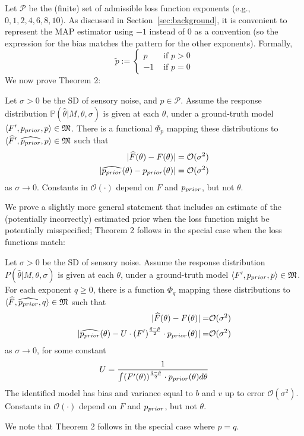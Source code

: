 Let $\mathcal{P}$ be the (finite) set of admissible loss function exponents (e.g., $0, 1, 2, 4, 6, 8, 10$).
As discussed in Section~\ref{sec:background}, it is convenient to represent the MAP estimator using $-1$ instead of $0$ as a convention (so the expression for the bias matches the pattern for the other exponents). Formally,
\begin{equation}\label{eq:tilde-p}
    \tilde{p} := \begin{cases} p &\text{ if } p > 0 \\ -1 & \text{ if } p=0\end{cases}
\end{equation}
We now prove Theorem 2:
\begin{thm}\label{thm:identifiability-well-specified}
Let $\sigma > 0$ be the SD of sensory noise, and $p \in \mathcal{P}$.
Assume the 
response distribution $\mathbb{P}(\widehat{\theta}|M,\theta, \sigma)$ is given at each $\theta$, under a ground-truth model $\langle F', p_{prior},p \rangle \in \mathfrak{M}$. 
There is a functional $\Phi_p$ mapping these distributions to $\langle \widehat{F}', \widehat{p_{prior}},p \rangle \in \mathfrak{M}$ such that 
\begin{align*}
|\widehat{F}(\theta) - F(\theta)| &= \mathcal{O}(\sigma^2) \\
|\widehat{p_{prior}}(\theta) - p_{prior}(\theta) | &= \mathcal{O}(\sigma^2) 
\end{align*}
as $\sigma \rightarrow 0$.
Constants in $\mathcal{O}(\cdot)$ depend on $F$ and $p_{prior}$, but not  $\theta$. 
\end{thm}
We prove a slightly more general statement that includes an estimate of the (potentially incorrectly) estimated prior when the loss function might be potentially misspecified; Theorem 2 follows in the special case when the loss functions match: 
\begin{thm}\label{thm:identifiability}
Let $\sigma > 0$ be the SD of sensory noise.
Assume the 
response distribution $P(\widehat{\theta}|M,\theta, \sigma)$ is given at each $\theta$, under a ground-truth model $\langle F', p_{prior},p \rangle \in \mathfrak{M}$. 
For each exponent $q \geq 0$, there is a function $\Phi_q$ mapping these distributions to $\langle \widehat{F}, \widehat{p_{prior}},q \rangle \in \mathfrak{M}$ such that 
\begin{align*}
|\widehat{F}(\theta) - F(\theta)| =& \mathcal{O}(\sigma^2) \\
|\widehat{p_{prior}}(\theta) - U \cdot (F')^{\frac{\tilde{q}-\tilde{p}}{2}} \cdot p_{prior}(\theta) | =& \mathcal{O}(\sigma^2) 
\end{align*}
as $\sigma \rightarrow 0$, for some constant
\begin{equation}
    U = \frac{1}{\int (F'(\theta))^{\frac{\tilde{q}-\tilde{p}}{2}} \cdot p_{prior}(\theta) d\theta }
\end{equation}
The identified model has bias and variance equal to $b$ and $v$ up to error $\mathcal{O}(\sigma^2)$.
Constants in $\mathcal{O}(\cdot)$ depend on $F$ and $p_{prior}$, but not  $\theta$. 
\end{thm}
We note that Theorem 2 follows in the special case where $p=q$.


